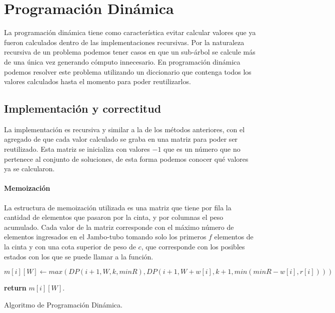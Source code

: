 \documentclass[10pt,a4paper]{article}
\begin{document}
\section{Programación Dinámica} \label{sec:dp}
La programación dinámica tiene como característica evitar calcular valores que ya fueron calculados dentro de las implementaciones recursivas. Por la naturaleza recursiva de un problema podemos tener casos en que un sub-árbol se calcule más de una única vez generando cómputo innecesario. En programación dinámica podemos resolver este problema utilizando un diccionario que contenga todos los valores calculados hasta el momento para poder reutilizarlos.

\subsection{Implementación y correctitud}
La implementación es recursiva y similar a la de los métodos anteriores, con el agregado de que cada valor calculado se graba en una matriz para poder ser reutilizado. Esta matriz se inicializa con valores $-1$ que es un número que no pertenece al conjunto de soluciones, de esta forma podemos conocer qué valores ya se calcularon.

\paragraph{Memoización}
La estructura de memoización utilizada es una matriz que tiene por fila la cantidad de elementos que pasaron por la cinta, y por columnas el peso acumulado. Cada valor de la matriz corresponde con el máximo número de elementos ingresados en el Jambo-tubo tomando solo los primeros $f$ elementos de la cinta y con una cota superior de peso de $c$, que corresponde con los posibles estados con los que se puede llamar a la función.

\begin{algorithm}
	\begin{algorithmic}[1]
		
		\EndIf
		
			$m[i][W] \leftarrow max(DP(i+1, W, k, minR), DP(i+1, W+w[i], k+1, min(minR-w[i], r[i])))$
		\EndIf
		
		\State \textbf{return} $m[i][W]$.
		
		\EndFunction
	\end{algorithmic}
	\caption{Algoritmo de Programación Dinámica.}
	\label{alg:dinamica}
\end{algorithm}
\end{document}
